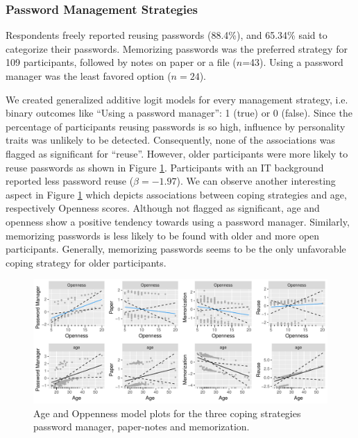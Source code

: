 
\subsubsection{Password Management Strategies}
Respondents freely reported reusing passwords (88.4\%), and 65.34\% said to categorize their passwords. Memorizing passwords was the preferred strategy for 109 participants, followed by notes on paper or a file ($n$=43). Using a password manager was the least favored option ($n=24$).

We created generalized additive logit models for every management strategy, i.e. binary outcomes like ``Using a password manager'': 1 (true) or 0 (false). Since the percentage of participants reusing passwords is so high, influence by personality traits was unlikely to be detected. Consequently, none of the associations was flagged as significant for ``reuse''. However, older participants were more likely to reuse passwords as shown in Figure \ref{fig:personality:study3:age-openness-coping-all}. Participants with an IT background reported less password reuse ($\beta=-1.97$). We can observe another interesting aspect in Figure \ref{fig:personality:study3:age-openness-coping-all} which depicts associations between coping strategies and age, respectively Openness scores. Although not flagged as significant, age and openness show a positive tendency towards using a password manager. Similarly, memorizing passwords is less likely to be found with older and more open participants. Generally, memorizing passwords seems to be the only unfavorable coping strategy for older participants. 
\begin{figure}[tbph]
	\centering
	\includegraphics[width=1\linewidth]{figures/personality/age-openness-coping-all}
	\caption{\label{fig:personality:study3:age-openness-coping-all}Age and Oppenness model plots for the three coping strategies password manager, paper-notes and memorization.}
\end{figure}


